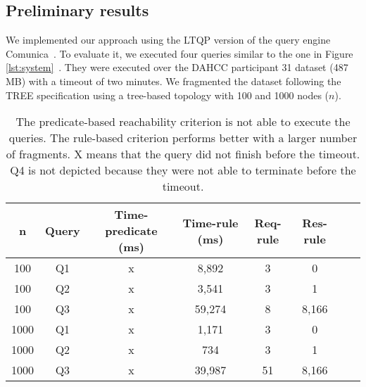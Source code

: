 \subsection{Preliminary results}

We implemented our approach using the LTQP version of the query engine Comunica~\cite{comunica}.
To evaluate it, we executed four queries similar to the one in Figure \ref{lst:system}~.
They were executed over the DAHCC participant 31 dataset (487 MB) with a timeout of two minutes.
We fragmented the dataset following the TREE specification using a tree-based topology with 100 and 1000 nodes ($n$).


\begin{table}[ht]
    \centering
    \begin{tabular}{|c|c|c|c|c|c|c|c|}
        \hline
        \textbf{n} & \textbf{Query} & \textbf{Time-predicate (ms)}  & \textbf{Time-rule (ms)} & \textbf{Req-rule} & \textbf{Res-rule} \\
        \hline
        100 & Q1 & x & 8,892& 3 & 0 \\
        100 & Q2 & x & 3,541& 3 & 1 \\
        100 & Q3 & x & 59,274& 8 & 8,166 \\
        \hhline{|=|=|=|=|=|=|=|=|}
        1000 & Q1 & x & 1,171& 3 & 0 \\
        1000 & Q2 & x & 734& 3 & 1 \\
        1000 & Q3 & x & 39,987& 51 & 8,166 \\
        \hline
    \end{tabular}
    \caption{
    The predicate-based reachability criterion is not able to execute the queries. 
    The rule-based criterion performs better with a larger number of fragments.
    X means that the query did not finish before the timeout.
    Q4 is not depicted because they were not able to terminate before the timeout.
    }
    \label{tab:result}
\end{table}

